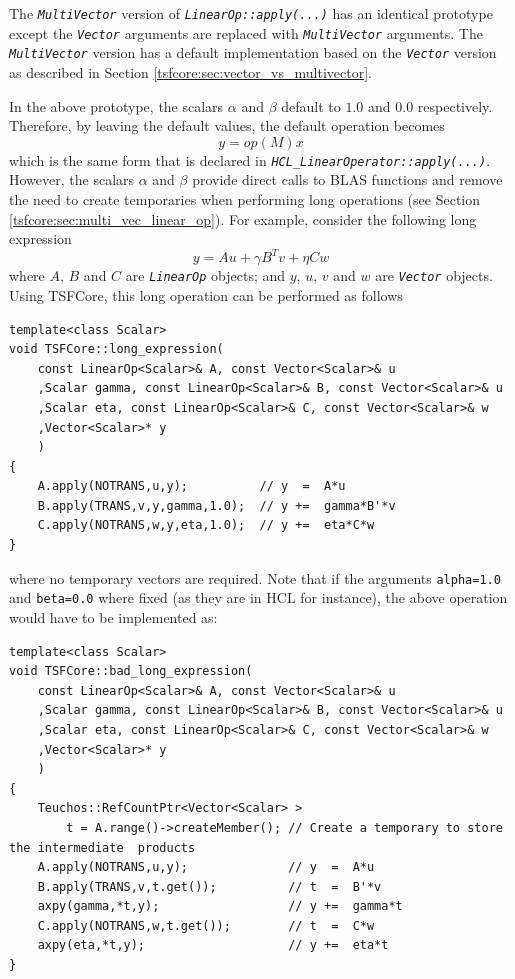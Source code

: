 The \texttt{\textit{Multi\-Vector}} version of
\texttt{\textit{LinearOp\-::apply(\-...)}} has an identical prototype
except the \texttt{\textit{Vector}} arguments are replaced with
\texttt{\textit{Multi\-Vector}} arguments.  The \texttt{\textit{Multi\-Vector}}
version has a default implementation based on the
\texttt{\textit{Vector}} version as described in Section
\ref{tsfcore:sec:vector_vs_multivector}.

In the above prototype, the scalars $\alpha$ and $\beta$ default to
$1.0$ and $0.0$ respectively.  Therefore, by leaving the default values,
the default operation becomes
%
\[
y = op(M) x
\]
%
which is the same form that is declared in
\texttt{\textit{HCL\-\_Linear\-Operator\-::apply(\-...)}}.  However, the scalars
$\alpha$ and $\beta$ provide direct calls to BLAS functions and remove
the need to create temporaries when performing long operations (see
Section \ref{tsfcore:sec:multi_vec_linear_op}).  For example, consider
the following long expression
%
\[
y = A u + \gamma B^T v + \eta C w
\]
%
where $A$, $B$ and $C$ are \texttt{\textit{LinearOp}} objects; and $y$,
$u$, $v$ and $w$ are \texttt{\textit{Vector}} objects.  Using TSFCore, this
long operation can be performed as follows

{\scriptsize\begin{verbatim}
template<class Scalar>
void TSFCore::long_expression(
    const LinearOp<Scalar>& A, const Vector<Scalar>& u
    ,Scalar gamma, const LinearOp<Scalar>& B, const Vector<Scalar>& u
    ,Scalar eta, const LinearOp<Scalar>& C, const Vector<Scalar>& w
    ,Vector<Scalar>* y
    )
{
    A.apply(NOTRANS,u,y);          // y  =  A*u
    B.apply(TRANS,v,y,gamma,1.0);  // y +=  gamma*B'*v
    C.apply(NOTRANS,w,y,eta,1.0);  // y +=  eta*C*w
}
\end{verbatim}}

\noindent where no temporary vectors are required.  Note that if the arguments
\texttt{alpha=1.0} and \texttt{beta=0.0} where fixed (as they are
in HCL for instance), the above operation would have to be implemented
as:

{\scriptsize\begin{verbatim}
template<class Scalar>
void TSFCore::bad_long_expression(
    const LinearOp<Scalar>& A, const Vector<Scalar>& u
    ,Scalar gamma, const LinearOp<Scalar>& B, const Vector<Scalar>& u
    ,Scalar eta, const LinearOp<Scalar>& C, const Vector<Scalar>& w
    ,Vector<Scalar>* y
    )
{
    Teuchos::RefCountPtr<Vector<Scalar> >
        t = A.range()->createMember(); // Create a temporary to store the intermediate  products
    A.apply(NOTRANS,u,y);              // y  =  A*u
    B.apply(TRANS,v,t.get());          // t  =  B'*v
    axpy(gamma,*t,y);                  // y +=  gamma*t
    C.apply(NOTRANS,w,t.get());        // t  =  C*w
    axpy(eta,*t,y);                    // y +=  eta*t
}
\end{verbatim}}


